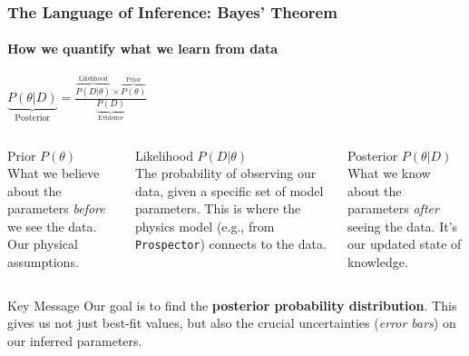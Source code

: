 \documentclass[aspectratio=169]{beamer}
\newcommand{\keyterm}[1]{\textbf{\textcolor{blue!70!black}{#1}}}
\begin{document}
\begin{frame}
    \frametitle{The Language of Inference: Bayes' Theorem}
    \framesubtitle{How we quantify what we learn from data}
    
    \begin{center}
    \Large
    $\underbrace{P(\theta|D)}_{\text{Posterior}} = \frac{\overbrace{P(D|\theta)}^{\text{Likelihood}} \times \overbrace{P(\theta)}^{\text{Prior}}}{\underbrace{P(D)}_{\text{Evidence}}}$
    \end{center}
    \vspace{1em}
    
    \begin{columns}[T]
        \begin{block}{Prior}
            $P(\theta)$ \\
            What we believe about the parameters \textit{before} we see the data. Our physical assumptions.
        \end{block}
        
        \begin{block}{Likelihood}
            $P(D|\theta)$ \\
            The probability of observing our data, given a specific set of model parameters. This is where the physics model (e.g., from \texttt{Prospector}) connects to the data.
        \end{block}
        
        \begin{block}{Posterior}
            $P(\theta|D)$ \\
            What we know about the parameters \textit{after} seeing the data. It's our updated state of knowledge.
        \end{block}
    \end{columns}
    
    \vspace{1em}
    \begin{alertblock}{Key Message}
        Our goal is to find the \keyterm{posterior probability distribution}. This gives us not just best-fit values, but also the crucial uncertainties (\textit{error bars}) on our inferred parameters.
    \end{alertblock}
\end{frame}
\end{document}
